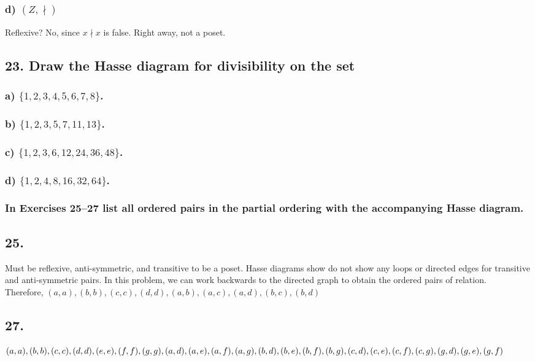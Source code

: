 \documentclass[11pt, oneside]{article} %
\numberwithin{equation}{section} %
\numberwithin{figure}{section} %
\numberwithin{table}{section} %
\begin{document}
\subsubsection{d) $(Z,\nmid)$}
Reflexive? No, since $x \nmid x $ is false. Right away, not a poset.

\subsection{23. Draw the Hasse diagram for divisibility on the set}
\subsubsection{a) $\{1,2,3,4,5,6,7,8\}$.}
\subsubsection{b) $\{1,2,3,5,7,11,13\}$.}
\subsubsection{c) $\{1,2,3,6,12,24,36,48\}$.}
\subsubsection{d) $\{1,2,4,8,16,32,64\}$.}

\subsubsection{In Exercises 25–27 list all ordered pairs in the partial ordering with the accompanying Hasse diagram.}
\subsection{25.}
Must be reflexive, anti-symmetric, and transitive to be a poset. Hasse diagrams show do not show any loops or directed edges for transitive and anti-symmetric pairs. In this problem, we can work backwards to the directed graph to obtain the ordered pairs of relation.\\
Therefore, $(a, a), (b, b), (c, c), (d,d), (a, b), (a, c), (a, d), (b, c), (b, d) $
\subsection{27.}
$(a,a),(b,b),(c,c),(d,d),(e,e),(f,f),(g,g),(a,d),(a,e),(a,f),(a,g),(b,d),(b,e),(b,f),(b,g),\\
(c,d),(c,e),(c,f),(c,g),(g,d),(g, e),(g,f)$
\end{document}
